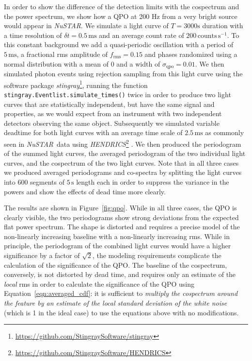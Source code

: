 \documentclass[12pt]{emulateapj}
\newcommand{\project}[1]{\textsl{#1}}
\newcommand{\nustar}{\project{NuSTAR}\xspace}
\begin{document}
In order to show the difference of the detection limits with the cospectrum and the power spectrum, we show how a QPO at 200 Hz from a very bright source would appear in \nustar. We simulate a light curve of $T=3000\mathrm{s}$ duration with a time resolution of $\delta t = 0.5 \,\mathrm{ms}$ and an average count rate of $200 \,\mathrm{counts}\,\mathrm{s}^{-1}$. To this constant background we add a quasi-periodic oscillation with a period of $5\,\mathrm{ms}$, a fractional rms amplitude of $f_\mathrm{rms} = 0.15$ and phases randomized using a normal distribution with a mean of $0$ and a width of $\sigma_\mathrm{qpo} = 0.01$. We then simulated photon events using rejection sampling from this light curve using the software package \textit{stingray}\footnote{\url{https://github.com/StingraySoftware/stingray}}, running the function \texttt{stingray.Eventlist.simulate\_times()} twice in order to produce two light curves that are statistically independent, but have the same signal and properties, as we would expect from an instrument with two independent detectors observing the same object. Subsequently we simulated variable deadtime for both light curves with an average time scale of $2.5 \,\mathrm{ms}$ as commonly seen in \nustar\ data \citep{Bachetti+15} using \textit{HENDRICS}\footnote{\url{https://github.com/StingraySoftware/HENDRICS}} \citep{bachetti2015b}. We then produced the periodogram of the summed light curves, the averaged periodogram of the two individual light curves, and the cospectrum of the two light curves. Note that in all three cases we produced averaged periodograms and co-spectra by splitting the light curves into 600 segments of $5\,\mathrm{s}$ length each in order to suppress the variance in the powers and show the effects of dead time more clearly.

The results are shown in Figure~\ref{fig:qpo}. While in all three cases, the QPO is clearly visible, the two periodograms show strong deviations from the expected flat power spectrum. The shape is distorted and requires a precise model of the non-linearly increasing baseline with a non-linearly increasing rms. While in principle, the periodogram of the combined light curves would have a higher significance by a factor of $\sqrt{2}$, the modeling requirements complicate the calculation of the significance of the QPO. 
The baseline of the cospectrum, conversely, is not distorted by dead time, and requires only an estimate of the \textit{local} rms in order to calculate the significance of the QPO using Equation~\ref{eqn:averaged_cdf}: it is sufficient to \textit{multiply the cospectrum around the feature by an estimate of the local standard deviation of the white noise} (which is 1 in the ideal case) to use the equations above with no modifications.
\end{document}
